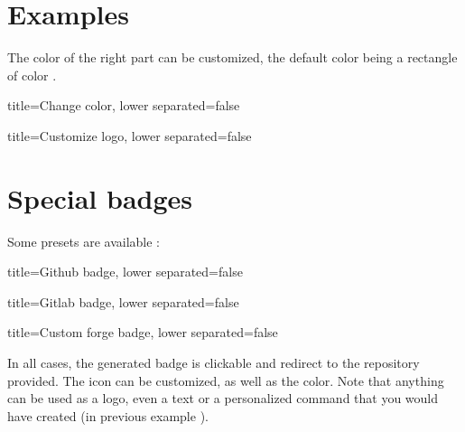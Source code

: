 \section{Examples}

The color of the right part can be customized, the default color being a rectangle of color .


\begin{tcblisting}{title={Change color}, lower separated=false}
\end{tcblisting}


\begin{tcblisting}{title={Customize logo}, lower separated=false}
\end{tcblisting}


\section{Special badges}


Some presets are available :

\begin{tcblisting}{title={Github badge}, lower separated=false}
\end{tcblisting}

\begin{tcblisting}{title={Gitlab badge}, lower separated=false}
\end{tcblisting}

\begin{tcblisting}{title={Custom forge badge}, lower separated=false}
\end{tcblisting}

In all cases, the generated badge is clickable and redirect to the repository provided.
The icon can be customized, as well as the color.
Note that anything can be used as a logo, even a text or a personalized command that you would have created (in previous example
\texttt{\def\checkmark{\tikz\fill[scale=0.4] (0,.35) -- (.25,0) -- (1,.7) -- (.25,.15) -- cycle;}}).
